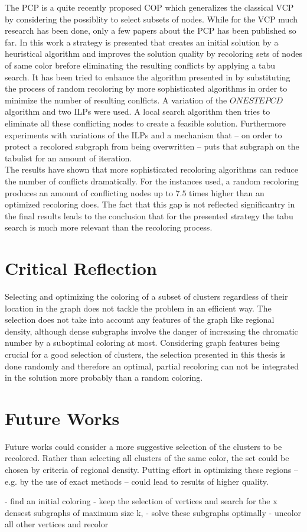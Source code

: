 
The PCP is a quite recently proposed COP which generalizes the classical VCP by considering the possiblity to select subsets of nodes. While for the VCP much research has been done, only a few papers about the PCP has been published so far. In this work a strategy is presented that creates an initial solution by a heuristical algorithm and improves the solution quality by recoloring sets of nodes of same color brefore eliminating the resulting conflicts by applying a tabu search. It has been tried to enhance the algorithm presented in \cite{noronha-06} by substituting the process of random recoloring by more sophisticated algorithms in order to minimize the number of resulting conlficts. A variation of the $ONESTEPCD$ algorithm \cite{li-00} and two ILPs were used. A local search algorithm then tries to eliminate all these conflicting nodes to create a feasible solution. Furthermore experiments with variations of the ILPs and a mechanism that -- on order to protect a recolored subgraph from being overwritten -- puts that subgraph on the tabulist for an amount of iteration.\\
The results have shown that more sophisticated recoloring algorithms can reduce the number of conflicts dramatically. For the instances used, a random recoloring produces an amount of conflicting nodes up to $7.5$ times higher than an optimized recoloring does. The fact that this gap is not reflected significantry in the final results leads to the conclusion that for the presented strategy the tabu search is much more relevant than the recoloring process.

\section{Critical Reflection}
Selecting and optimizing the coloring of a subset of clusters regardless of their location in the graph does not tackle the problem in an efficient way. The selection does not take into account any features of the graph like regional density, although dense subgraphs involve the danger of increasing the chromatic number by a suboptimal coloring at most. Considering graph features being crucial for a good selection of clusters, the selection presented in this thesis is done randomly and therefore an optimal, partial recoloring can not be integrated in the solution more probably than a random coloring.  

\section{Future Works}
Future works could consider a more suggestive selection of the clusters to be recolored. Rather than selecting all clusters of the same color, the set could be chosen by criteria of regional density. Putting effort in optimizing these regions -- e.g. by the use of exact methods -- could lead to results of higher quality. 

- find an initial coloring
- keep the selection of vertices and search for the x densest subgraphs of maximum size k, 
- solve these subgraphs optimally
- uncolor all other vertices and recolor